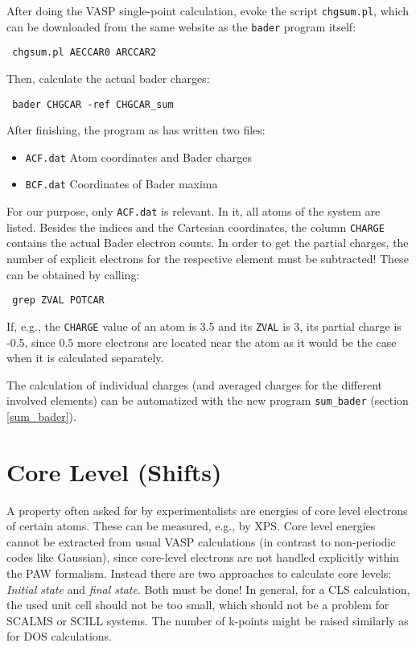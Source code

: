\documentclass[a4paper,11pt]{article}
\begin{document}
After doing the VASP single-point calculation, evoke the script \texttt{chgsum.pl},
which can be downloaded from the same website as the \texttt{bader} program itself:

\begin{verbatim}
 chgsum.pl AECCAR0 ARCCAR2
\end{verbatim}

Then, calculate the actual bader charges:

\begin{verbatim}
 bader CHGCAR -ref CHGCAR_sum
\end{verbatim}

After finishing, the program as has written two files:

\begin{itemize}
 \item \texttt{ACF.dat} Atom coordinates and Bader charges
 \item \texttt{BCF.dat} Coordinates of Bader maxima
\end{itemize}

For our purpose, only \texttt{ACF.dat} is relevant. 
In it, all atoms of the system are listed. Besides the indices and the Cartesian
coordinates, the column \texttt{CHARGE} contains the actual Bader electron counts.
In order to get the partial charges, the number of explicit electrons for the respective 
element must be subtracted!
These can be obtained by calling:

\begin{verbatim}
 grep ZVAL POTCAR
\end{verbatim}

If, e.g., the \texttt{CHARGE} value of an atom is 3.5 and its \texttt{ZVAL} is 3, its 
partial charge is -0.5, since 0.5 more electrons are located near the atom as it would be 
the case when it is calculated separately.

The calculation of individual charges (and averaged charges for the different involved elements)
can be automatized with the new program \texttt{sum\_bader} (section \ref{sum_bader}).

\section{Core Level (Shifts)}

A property often asked for by experimentalists are energies of core level electrons of 
certain atoms. These can be measured, e.g., by XPS.
Core level energies cannot be extracted from usual VASP calculations (in contrast to 
non-periodic codes like Gaussian), since core-level electrons are not handled 
explicitly within the PAW formalism. 
Instead there are two approaches to calculate core levels: \textit{Initial state} and 
\textit{final state}. 
Both must be done!
In general, for a CLS calculation, the used unit cell should not be too small, which 
should not be a problem for SCALMS or SCILL systems. The number of k-points might
be raised similarly as for DOS calculations.
\end{document}
